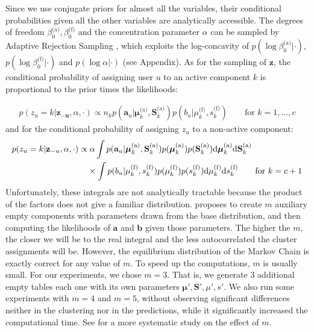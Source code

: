 \documentclass[smallextended]{svjour3}          %
\newcommand{\betaoa}{\beta_{0}^\text{(a)}}
\newcommand{\betaof}{\beta_{0}^\text{(f)}}
\newcommand{\Muk}{\boldsymbol{\mu}_{k}^\text{(a)}}
\newcommand{\Sk}{\mathbf{S}_{k}^\text{(a)}}
\newcommand{\muk}{\mu_{k}^\text{(f)}}
\newcommand{\sk}{s_{k}^\text{(f)}}
\begin{document}
Since we use conjugate priors for almost all the variables, their conditional probabilities given all the other variables are analytically accessible. The degrees of freedom $\betaoa, \betaof$ and the concentration parameter $\alpha$ can be sampled by Adaptive Rejection Sampling \citep{Gilks1992}, which exploits the log-concavity of  $p(\log \beta_0^{\text{(a)}} | \cdot)$,  $p(\log \beta_0^{\text{(f)}} | \cdot)$ and $p(\log \alpha | \cdot)$ (see Appendix). As for the sampling of $\mathbf{z}$, the conditional probability of assigning user $u$ to an active component $k$ is proportional to the prior times the likelihoods:

\begin{align}
p(z_u = k | \mathbf{z_{-u}}, \alpha, \cdot)
\propto 
n_{k}
   p(\mathbf{a}_{u} |\Muk, \Sk)    
   p({b_u} | \muk, \sk) \qquad \text{for } k=1,...,c
\end{align}
and for the conditional probability of assigning $z_u$ to a non-active component:
\begin{align}
p(z_u = k | \mathbf{z}_{-u}, \alpha, \cdot)
\propto&
\;\alpha 
   \int 
   p(\mathbf{a}_{u} |\Muk, \Sk)  p(\Muk) p(\Sk)      
   \text{d}\Muk
   \text{d}\Sk\notag\\
   &\times
   \int 
   p(b_u | \muk, \sk)
   p(\muk)p(\sk) 
   \text{d}\muk
   \text{d}\sk \qquad \text{for } k=c+1
\end{align}
Unfortunately, these integrals are not analytically tractable because the product of the factors does not give a familiar distribution. \cite{Neal2000} proposes to create $m$ auxiliary empty components with parameters drawn from the base distribution, and then computing the likelihoods of $\mathbf{a}$ and $\mathbf{b}$ given those parameters. The higher the $m$, the closer we will be to the real integral and the less autocorrelated the cluster assignments will be. However, the equilibrium distribution of the Markov Chain is exactly correct for any value of $m$. To speed up the computations, $m$ is usually small. For our experiments, we chose $m=3$. That is, we generate $3$ additional empty tables each one with its own parameters  $\boldsymbol{\mu'}, \mathbf{S'}, \mu', s'$. We also run some experiments with $m=4$ and $m=5$, without observing significant differences neither in the clustering nor in the predictions, while it significantly increased the computational time. See \cite{Neal2000} for a more systematic study on the effect of $m$. 
\end{document}

